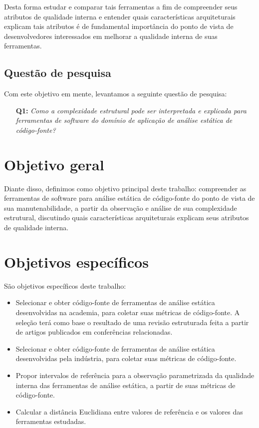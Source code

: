 Desta forma estudar e comparar tais ferramentas a fim de compreender seus
atributos de qualidade interna e entender quais características arquiteturais
explicam tais atributos é de fundamental importância do ponto de vista de
desenvolvedores interessados em melhorar a qualidade interna de suas
ferramentas.

\subsection{Questão de pesquisa}

Com este objetivo em mente, levantamos a seguinte questão de pesquisa:

\begin{enumerate}
  \item [{\bf Q1:}] {\em Como a complexidade estrutural pode ser interpretada
    e explicada para ferramentas de software do domínio de aplicação de
    análise estática de código-fonte?}
\end{enumerate}

\section{Objetivo geral}

Diante disso, definimos como objetivo principal deste trabalho: compreender
as ferramentas de software para análise estática de código-fonte do ponto de
vista de sua manutenabilidade, a partir da observação e análise de sua complexidade
estrutural, discutindo quais características arquiteturais explicam seus
atributos de qualidade interna.

\section{Objetivos específicos}

São objetivos específicos deste trabalho:

\begin{itemize}
  \item Selecionar e obter código-fonte de ferramentas de análise estática
    desenvolvidas na academia, para coletar suas métricas de código-fonte.  A
    seleção terá como base o resultado de uma revisão estruturada feita a
    partir de artigos publicados em conferências relacionadas. 
  \item Selecionar e obter código-fonte de ferramentas de análise estática
    desenvolvidas pela indústria, para coletar suas métricas de código-fonte.
  \item Propor intervalos de referência para a observação parametrizada da
    qualidade interna das ferramentas de análise estática, a partir de suas
    métricas de código-fonte.
  \item Calcular a distância Euclidiana entre valores de referência e os
    valores das ferramentas estudadas.
\end{itemize}


